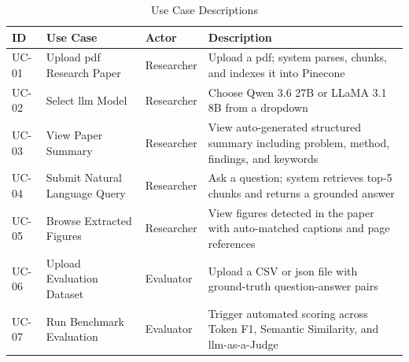 \begin{table}[H]

\centering

\caption{Use Case Descriptions}

\label{tab:usecases}

\begin{tabular}{|p{1.2cm}|p{4cm}|p{2.5cm}|p{5cm}|}

\hline

\textbf{ID} & \textbf{Use Case} & \textbf{Actor} & \textbf{Description} \\

\hline

UC-01 & Upload \gls{pdf} Research Paper & Researcher & Upload a \gls{pdf}; system parses, chunks, and indexes it into Pinecone \\

\hline

UC-02 & Select \gls{llm} Model & Researcher & Choose Qwen 3.6 27B or LLaMA 3.1 8B from a dropdown \\

\hline

UC-03 & View Paper Summary & Researcher & View auto-generated structured summary including problem, method, findings, and keywords \\

\hline

UC-04 & Submit Natural Language Query & Researcher & Ask a question; system retrieves top-5 chunks and returns a grounded answer \\

\hline

UC-05 & Browse Extracted Figures & Researcher & View figures detected in the paper with auto-matched captions and page references \\

\hline

UC-06 & Upload Evaluation Dataset & Evaluator & Upload a CSV or \gls{json} file with ground-truth question-answer pairs \\

\hline

UC-07 & Run Benchmark Evaluation & Evaluator & Trigger automated scoring across Token F1, Semantic Similarity, and \gls{llm}-as-a-Judge \\

\hline

\end{tabular}

\end{table}

